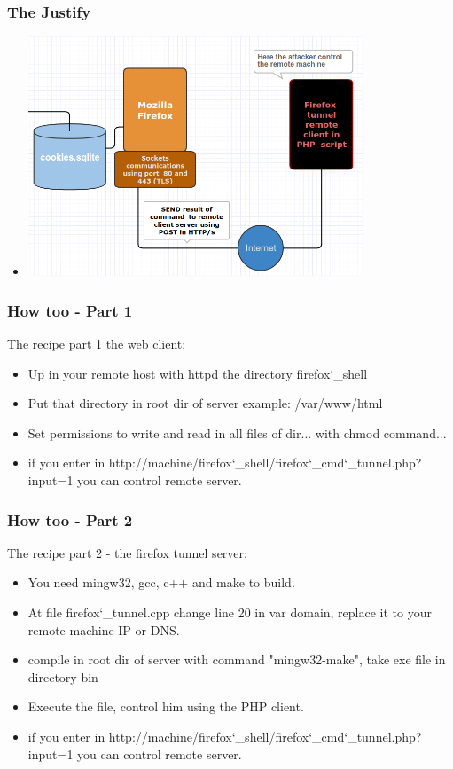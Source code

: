 \documentclass[serif,mathserif]{beamer}
\begin{document}
\begin{frame}
  \frametitle{The Justify}
  \begin{itemize}
  \item \includegraphics[width=10.0cm]{img/tunnel8.png}
  \end{itemize}
\end{frame}

\begin{frame}
  \frametitle{How too -  Part 1}
  The recipe part 1 the web client:\pause
  \begin{itemize}
  \item Up in your remote host with httpd the directory firefox\char`_shell \pause
  \item Put that directory in root dir of server  example: /var/www/html \pause
  \item Set permissions to write and read in all files of dir... with chmod command...\pause
  \item if you enter in http://machine/firefox\char`_shell/firefox\char`_cmd\char`_tunnel.php?input=1 you can control remote server. %
  \end{itemize}
\end{frame}

\begin{frame}
  \frametitle{How too -  Part 2}
  The recipe part 2 - the firefox tunnel server:\pause
  \begin{itemize}
  \item You need mingw32, gcc, c++ and make to build.\pause
  \item At file firefox\char`_tunnel.cpp change line 20 in var domain, replace it to your remote machine IP or DNS. \pause
  \item compile in root dir of server with command "mingw32-make", take exe file in directory bin \pause
  \item Execute the file, control him  using the PHP client. \pause
  \item if you enter in http://machine/firefox\char`_shell/firefox\char`_cmd\char`_tunnel.php?input=1 you can control remote  server.  
  \end{itemize}
\end{frame}
\end{document}
